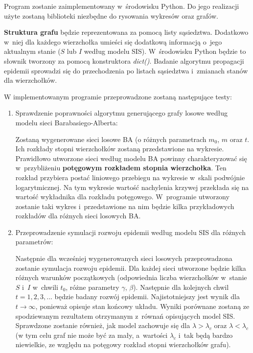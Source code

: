 Program zostanie zaimplementowany w~środowisku Python. Do jego realizacji użyte zostaną biblioteki niezbędne do rysowania wykresów oraz grafów.

\textbf{Struktura grafu} będzie reprezentowana za pomocą listy sąsiedztwa. Dodatkowo w~niej dla każdego wierzchołka umieści się dodatkową informacją o~jego aktualnym stanie ($S$ lub $I$ według modelu SIS). W~środowisku Python będzie to słownik tworzony za pomocą konstruktora \textit{dict()}. Badanie algorytmu propagacji epidemii sprowadzi się do przechodzenia po listach sąsiedztwa i~zmianach stanów dla wierzchołków.

W implementowanym programie przeprowadzone zostaną następujące testy:
\begin{enumerate}
\item Sprawdzenie poprawności algorytmu generującego grafy losowe według modelu sieci Barabasiego-Alberta:

Zostaną wygenerowane sieci losowe BA (o różnych parametrach $m_0$, $m$ oraz $t$. Ich rozkłady stopni wierzchołków zostaną przedstawione na wykresie. Prawidłowo utworzone sieci według modelu BA powinny charakteryzować się w~przybliżeniu \textbf{potęgowym rozkładem stopnia wierzchołka}. Ten rozkład przybiera postać liniowego przebiegu na wykresie w~skali podwójnie logarytmicznej. Na tym wykresie wartość nachylenia krzywej przekłada się na wartość wykładnika dla rozkładu potęgowego. W~programie utworzony zostanie taki wykres i~przedstawione na nim będzie kilka przykładowych rozkładów dla różnych sieci losowych BA.

\item Przeprowadzenie symulacji rozwoju epidemii według modelu SIS dla różnych parametrów:

Następnie dla wcześniej wygenerowanych sieci losowych przeprowadzona zostanie symulacja rozwoju epidemii. Dla każdej sieci utworzone będzie kilka różnych warunków początkowych (odpowiednia liczba wierzchołków w~stanie $S$ i~$I$ w~chwili $t_0$, różne parametry $\gamma$, $\beta$). Następnie dla kolejnych chwil $t = 1,2,3,...$ będzie badany rozwój epidemii. Najistotniejszy jest wynik dla $t\to\infty$, ponieważ opisuje stan końcowy układu. Wyniki porównane zostaną ze spodziewanym rezultatem otrzymanym z~równań opisujących model SIS. Sprawdzone zostanie również, jak model zachowuje się dla $\lambda > \lambda_c$ oraz $\lambda < \lambda_c$ (w tym celu graf nie może być za mały, a~wartości $\lambda_c$ i~tak będą bardzo niewielkie, ze względu na potęgowy rozkład stopni wierzchołków grafu). 


\end{enumerate}
